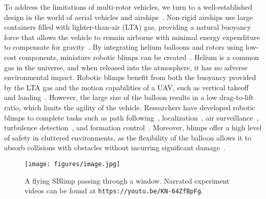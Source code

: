 \documentclass[conference]{ieeeconf}
\begin{document}
To address the limitations of multi-rotor vehicles, we turn to a well-established design in the world of aerial vehicles and airships~\cite{M2021100741}. Non-rigid airships use large containers filled with lighter-than-air (LTA) gas, providing a natural buoyancy force that allows the vehicle to remain airborne with minimal energy expenditure to compensate for gravity~\cite{680971}. By integrating helium balloons and rotors using low-cost components, miniature robotic blimps can be created~\cite{680973}. Helium is a common gas in the universe, and when released into the atmosphere, it has no adverse environmental impact. Robotic blimps benefit from both the buoyancy provided by the LTA gas and the motion capabilities of a UAV, such as vertical takeoff and landing~\cite{Petrescu2017}. However, the large size of the balloon results in a low drag-to-lift ratio, which limits the agility of the vehicle.
Researchers have developed robotic blimps to complete tasks such as path following~\cite{9062572}, localization~\cite{muller2013efficient}, air surveillance~\cite{tan2012twin}, turbulence detection~\cite{arun2006atmos}, and formation control~\cite{9494636}. Moreover, blimps offer a high level of safety in cluttered environments, as the flexibility of the balloon allows it to absorb collisions with obstacles without incurring significant damage~\cite{doi:10.1177/1756829317705326,huang2019duckiefloat}.
\begin{figure}[t]
    \centering
    \texttt{[image: figures/image.jpg]}
    \caption{A flying SBlimp passing through a window. Narrated experiment videos can be found at \texttt{https://youtu.be/KN-64ZfBpFg}.}
    \label{fig:blimp}
    \vspace{-1.5em}
\end{figure}
\end{document}
